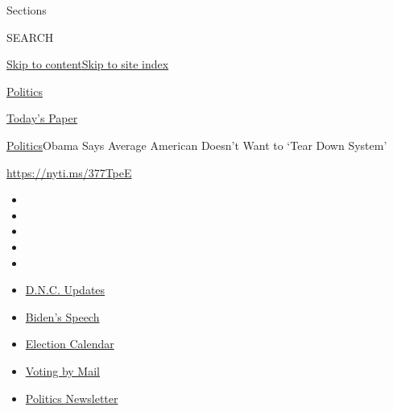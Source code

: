 Sections

SEARCH

\protect\hyperlink{site-content}{Skip to
content}\protect\hyperlink{site-index}{Skip to site index}

\href{https://www.nytimes3xbfgragh.onion/section/politics}{Politics}

\href{https://myaccount.nytimes3xbfgragh.onion/auth/login?response_type=cookie\&client_id=vi}{}

\href{https://www.nytimes3xbfgragh.onion/section/todayspaper}{Today's
Paper}

\href{/section/politics}{Politics}\textbar{}Obama Says Average American
Doesn't Want to `Tear Down System'

\url{https://nyti.ms/377TpeE}

\begin{itemize}
\item
\item
\item
\item
\item
\end{itemize}

\begin{itemize}
\item
  \href{https://www.nytimes3xbfgragh.onion/live/2020/08/20/us/dnc-convention-election?action=click\&pgtype=Article\&state=default\&region=TOP_BANNER\&context=storylines_menu}{D.N.C.
  Updates}
\item
  \href{https://www.nytimes3xbfgragh.onion/2020/08/20/us/politics/biden-presidential-nomination-dnc.html?action=click\&pgtype=Article\&state=default\&region=TOP_BANNER\&context=storylines_menu}{Biden's
  Speech}
\item
  \href{https://www.nytimes3xbfgragh.onion/interactive/2019/us/elections/2020-presidential-election-calendar.html?action=click\&pgtype=Article\&state=default\&region=TOP_BANNER\&context=storylines_menu}{Election
  Calendar}
\item
  \href{https://www.nytimes3xbfgragh.onion/interactive/2020/08/11/us/politics/vote-by-mail-us-states.html?action=click\&pgtype=Article\&state=default\&region=TOP_BANNER\&context=storylines_menu}{Voting
  by Mail}
\item
  \href{https://www.nytimes3xbfgragh.onion/newsletters/politics?action=click\&pgtype=Article\&state=default\&region=TOP_BANNER\&context=storylines_menu}{Politics
  Newsletter}
\end{itemize}

